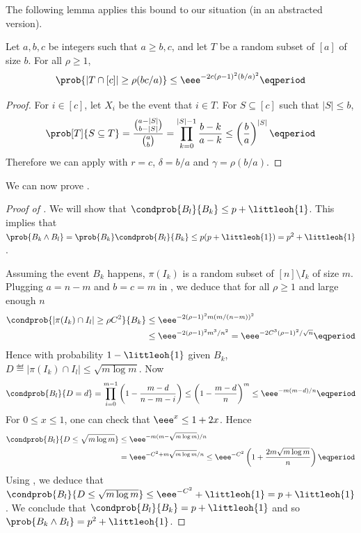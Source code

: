 \documentclass{toc}
\begin{document}
%

The following lemma applies this bound to our situation (in an abstracted version).

\begin{lemma} \label{lem:prob-est}
 Let $a,b,c$ be integers such that $a \geq b,c$, and let $T$ be a random subset of $[a]$ of size $b$. For all $\rho \geq 1$,
 \begin{equation*}
  \prob{|T \cap [c]| \geq \rho (bc/a)} \leq \eee^{-2c(\rho-1)^2(b/a)^2} \eqperiod
 \end{equation*}
\end{lemma}
\begin{proof}
 For $i \in [c]$, let $X_i$ be the event that $i \in T$. For $S \subseteq [c]$ such that $|S| \leq b$,
\begin{equation}
 \prob[T]{S \subseteq T} = \frac{\binom{a-|S|}{b-|S|}}{\binom{a}{b}} =
 \prod_{k=0}^{|S|-1} \frac{b-k}{a-k} \leq \left(\frac{b}{a}\right)^{|S|} \eqperiod
\end{equation}
 Therefore we can apply  with $r = c$, $\delta = b/a$ and $\gamma = \rho(b/a)$.
\end{proof}

We can now prove .

\begin{proof}[Proof of ]
 We will show that $\condprob{B_l}{B_k} \leq p + \littleoh{1}$. This implies that $\prob{B_k \land B_l} = \prob{B_k} \condprob{B_l}{B_k} \leq p(p + \littleoh{1}) = p^2 + \littleoh{1}$.

 Assuming the event $B_k$ happens, $\pi(I_k)$ is a random subset of $[n] \setminus I_k$ of size $m$. Plugging $a = n-m$ and $b = c = m$ in , we deduce that for all $\rho \geq 1$ and large enough $n$
 \begin{align}
  \condprob{|\pi(I_k) \cap I_l| \geq \rho C^2}{B_k} &\leq \eee^{-2(\rho-1)^2m(m/(n-m))^2} \\&\leq \eee^{-2(\rho-1)^2 m^3/n^2} = \eee^{-2C^3(\rho-1)^2/\sqrt{n}} \eqperiod
 \end{align}
 Hence with probability $1-\littleoh{1}$ given $B_k$, $D \eqdef |\pi(I_k) \cap I_l| \leq \sqrt{m\log m}$. Now
\begin{equation}
 \condprob{B_l}{D=d} = \prod_{i=0}^{m-1} \left(1 - \frac{m-d}{n-m-i}\right) \leq \left(1 - \frac{m-d}{n}\right)^m \leq \eee^{-m(m-d)/n} \eqperiod
\end{equation}
%
%
 For $0 \leq x \leq 1$, one can check that $\eee^x \leq 1 + 2x$. Hence
\begin{align}
 \condprob{B_l}{D \leq \sqrt{m\log m}} &\leq \eee^{-m(m-\sqrt{m\log m})/n} \\ &= \eee^{-C^2+m\sqrt{m\log m}/n} \leq \eee^{-C^2} \left(1 + \frac{2m\sqrt{m\log m}}{n}\right) \eqperiod
\end{align}
 Using , we deduce that $\condprob{B_l}{D \leq \sqrt{m\log m}} \leq \eee^{-C^2} + \littleoh{1} = p + \littleoh{1}$.
 We conclude that $\condprob{B_l}{B_k} = p + \littleoh{1}$ and so $\prob{B_k \land B_l} = p^2 + \littleoh{1}$.
\end{proof}
\end{document}
